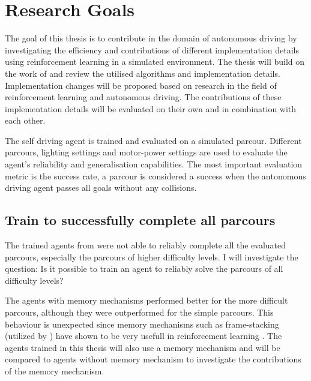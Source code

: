 


\chapter{Research Goals}
\label{cha:Research Goals}

The goal of this thesis is to contribute in the domain of autonomous driving by investigating the efficiency and contributions of different implementation details using reinforcement learning in a simulated environment. The thesis will build on the work of \autocite{maximilian} and review the utilised algorithms and implementation details. Implementation changes will be proposed based on research in the field of reinforcement learning and autonomous driving. The contributions of these implementation details will be evaluated on their own and in combination with each other. 


The self driving agent is trained and evaluated on a simulated parcour. Different parcours, lighting settings and motor-power settings are used to evaluate the agent's reliability and generalisation capabilities. The most important evaluation metric is the success rate, a parcour is considered a success when the autonomous driving agent passes all goals without any collisions.

\section*{Train to successfully complete all parcours}

The trained agents from \autocite{maximilian} were not able to reliably complete all the evaluated parcours, especially the parcours of higher difficulty levels. I will investigate the question: Is it possible to train an agent to reliably solve the parcours of all difficulty levels?

The agents with memory mechanisms performed better for the more difficult parcours, although they were outperformed for the simple parcours. This behaviour is unexpected since memory mechanisms such as frame-stacking (utilized by \autocite{maximilian}) have shown to be very usefull in reinforcement learning \autocite{frame-stacking}. The agents trained in this thesis will also use a memory mechanism and will be compared to agents without memory mechanism to investigate the contributions of the memory mechanism.


